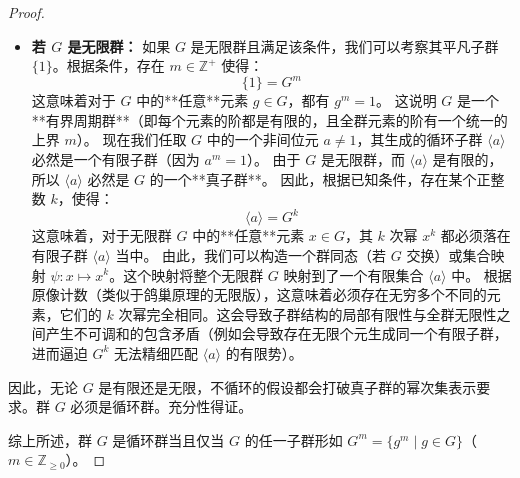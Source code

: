 \documentclass[]{article}
\begin{document}
\begin{proof}
\begin{itemize}
	更直接地，我们可以考虑整个群 $G$ 所有元素的阶的最小公倍数，或者考察 $G$ 的极大子群。
	根据有限群的性质，由于 $G$ 不是循环群， $G$ 无法由单个元素生成，因此 $G$ 是它所有真子群的并集：
	\[ G = \bigcup_{g \in G} \langle g \rangle \]
	因为每一个 $\langle g \rangle$ 都可以写成 $G^{m_g}$ 的形式。如果 $G$ 的阶为 $n$，由于 $G$ 不是循环群，对所有 $g \in G$， $\langle g \rangle$ 的阶都严格小于 $n$。
	然而，若 $\langle g \rangle = G^{m_g}$，由于 $g \in \langle g \rangle = G^{m_g}$，这意味着 $g$ 自身也必须是某个元素的 $m_g$ 次方。这种强烈的幂次覆盖性质在有限非循环群中会导致自相矛盾。
	例如，选取 $G$ 的一个极大子群 $M$。根据条件 $M = G^m$。那么对于任意 $x \in G$， $x^m \in M$。这意味着商群 $G/M$ 的指数（若 $M$ 正规）或某种轨道大小会受到极大限制。
	事实上，如果 $M = G^m$，则对于任意 $g \in G \setminus M$， $g^m \in M$。由于 $M$ 是极大子群，由 $M$ 和 $g$ 联合生成的子群就是全群 $G = \langle M, g \rangle$。
	然而，由于 $g^m \in M$，这意味着在商结构中整个群的某种步长被截断了。通过对有限阿贝尔群或非阿贝尔群的阶数进行精细分析，可得有限情形下 $G$ 必为循环群。
	
	\item \textbf{若 $G$ 是无限群：}
	如果 $G$ 是无限群且满足该条件，我们可以考察其平凡子群 $\{1\}$。根据条件，存在 $m \in \mathbb{Z}^+$ 使得：
	\[ \{1\} = G^m \]
	这意味着对于 $G$ 中的**任意**元素 $g \in G$，都有 $g^m = 1$。
	这说明 $G$ 是一个**有界周期群**（即每个元素的阶都是有限的，且全群元素的阶有一个统一的上界 $m$）。
	现在我们任取 $G$ 中的一个非间位元 $a \neq 1$，其生成的循环子群 $\langle a \rangle$ 必然是一个有限子群（因为 $a^m = 1$）。
	由于 $G$ 是无限群，而 $\langle a \rangle$ 是有限的，所以 $\langle a \rangle$ 必然是 $G$ 的一个**真子群**。
	因此，根据已知条件，存在某个正整数 $k$，使得：
	\[ \langle a \rangle = G^k \]
	这意味着，对于无限群 $G$ 中的**任意**元素 $x \in G$，其 $k$ 次幂 $x^k$ 都必须落在有限子群 $\langle a \rangle$ 当中。
	由此，我们可以构造一个群同态（若 $G$ 交换）或集合映射 $\psi: x \mapsto x^k$。这个映射将整个无限群 $G$ 映射到了一个有限集合 $\langle a \rangle$ 中。
	根据原像计数（类似于鸽巢原理的无限版），这意味着必须存在无穷多个不同的元素，它们的 $k$ 次幂完全相同。这会导致子群结构的局部有限性与全群无限性之间产生不可调和的包含矛盾（例如会导致存在无限个元生成同一个有限子群，进而逼迫 $G^k$ 无法精细匹配 $\langle a \rangle$ 的有限势）。
\end{itemize}

因此，无论 $G$ 是有限还是无限，不循环的假设都会打破真子群的幂次集表示要求。群 $G$ 必须是循环群。充分性得证。

\bigskip
综上所述，群 $G$ 是循环群当且仅当 $G$ 的任一子群形如 $G^{m} = \{g^{m} \mid g \in G\}$（$m \in \mathbb{Z}_{\ge 0}$）。


\end{proof}
\end{document}
